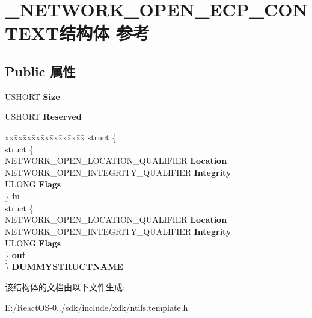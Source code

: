 \hypertarget{struct___n_e_t_w_o_r_k___o_p_e_n___e_c_p___c_o_n_t_e_x_t}{}\section{\+\_\+\+N\+E\+T\+W\+O\+R\+K\+\_\+\+O\+P\+E\+N\+\_\+\+E\+C\+P\+\_\+\+C\+O\+N\+T\+E\+X\+T结构体 参考}
\label{struct___n_e_t_w_o_r_k___o_p_e_n___e_c_p___c_o_n_t_e_x_t}
\subsection*{Public 属性}
\begin{DoxyCompactItemize}
\item 
\mbox{\label{struct___n_e_t_w_o_r_k___o_p_e_n___e_c_p___c_o_n_t_e_x_t_ad16f8223777ab951935012596e873228}} 
U\+S\+H\+O\+RT {\bfseries Size}
\item 
\mbox{\label{struct___n_e_t_w_o_r_k___o_p_e_n___e_c_p___c_o_n_t_e_x_t_a3183a4238b5bc20a500d5466a9d5e33d}} 
U\+S\+H\+O\+RT {\bfseries Reserved}
\item 
\mbox{\label{struct___n_e_t_w_o_r_k___o_p_e_n___e_c_p___c_o_n_t_e_x_t_af1effe5050185de409687d96dedca1f6}} 
\begin{tabbing}
xx\=xx\=xx\=xx\=xx\=xx\=xx\=xx\=xx\=\kill
struct \{\\
\>struct \{\\
\>\>NETWORK\_OPEN\_LOCATION\_QUALIFIER {\bfseries Location}\\
\>\>NETWORK\_OPEN\_INTEGRITY\_QUALIFIER {\bfseries Integrity}\\
\>\>ULONG {\bfseries Flags}\\
\>\} {\bfseries in}\\
\>struct \{\\
\>\>NETWORK\_OPEN\_LOCATION\_QUALIFIER {\bfseries Location}\\
\>\>NETWORK\_OPEN\_INTEGRITY\_QUALIFIER {\bfseries Integrity}\\
\>\>ULONG {\bfseries Flags}\\
\>\} {\bfseries out}\\
\} {\bfseries DUMMYSTRUCTNAME}\\

\end{tabbing}\end{DoxyCompactItemize}


该结构体的文档由以下文件生成\+:\begin{DoxyCompactItemize}
\item 
E\+:/\+React\+O\+S-\/0../sdk/include/xdk/ntifs.\+template.\+h\end{DoxyCompactItemize}
